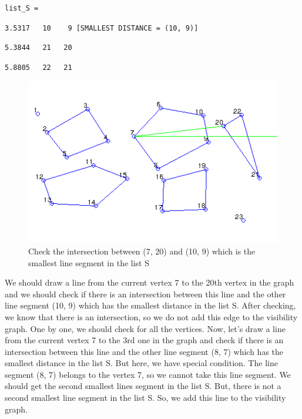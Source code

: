 \documentclass{article}
\begin{document}
\hspace{1cm}\texttt{list\_S =}

\hspace{2cm}\texttt{3.5317 \ \ 10 \ \ \ 9 [SMALLEST DISTANCE = (10, 9)]}

\hspace{2cm}\texttt{5.3844 \ \ 21 \ \ 20}

\hspace{2cm}\texttt{5.8805 \ \ 22 \ \ 21}

\begin{figure}[!h]
\begin{center}
\includegraphics[scale=0.9]{09}
\caption{Check the intersection between (7, 20) and (10, 9) which is the smallest line segment in the list S}
\end{center}
\end{figure}

We should draw a line from the current vertex 7 to the 20th vertex in the graph and we should check if there is an intersection between this line and the other line segment (10, 9) which has the smallest distance in the list S. After checking, we know that there is an intersection, so we do not add this edge to the visibility graph. One by one, we should check for all the vertices. Now, let's draw a line from the current vertex 7 to the 3rd one in the graph and check if there is an intersection between this line and the other line segment (8, 7) which has the smallest distance in the list S. But here, we have special condition. The line segment (8, 7) belongs to the vertex 7, so we cannot take this line segment. We should get the second smallest lines segment in the list S. But, there is not a second smallest line segment in the list S. So, we add this line to the visibility graph.
\\
\end{document}
